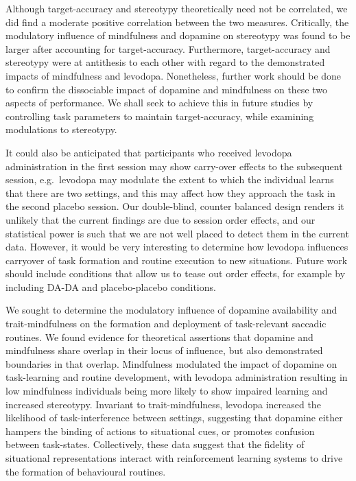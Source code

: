 \documentclass[
  man]{apa6}
\begin{document}
Although target-accuracy and stereotypy theoretically need not be correlated, we did find a moderate positive correlation between the two measures. Critically, the modulatory influence of mindfulness and dopamine on stereotypy was found to be larger after accounting for target-accuracy. Furthermore, target-accuracy and stereotypy were at antithesis to each other with regard to the demonstrated impacts of mindfulness and levodopa. Nonetheless, further work should be done to confirm the dissociable impact of dopamine and mindfulness on these two aspects of performance. We shall seek to achieve this in future studies by controlling task parameters to maintain target-accuracy, while examining modulations to stereotypy.

It could also be anticipated that participants who received levodopa administration in the first session may show carry-over effects to the subsequent session, e.g.~levodopa may modulate the extent to which the individual learns that there are two settings, and this may affect how they approach the task in the second placebo session. Our double-blind, counter balanced design renders it unlikely that the current findings are due to session order effects, and our statistical power is such that we are not well placed to detect them in the current data. However, it would be very interesting to determine how levodopa influences carryover of task formation and routine execution to new situations. Future work should include conditions that allow us to tease out order effects, for example by including DA-DA and placebo-placebo conditions.

We sought to determine the modulatory influence of dopamine availability and trait-mindfulness on the formation and deployment of task-relevant saccadic routines. We found evidence for theoretical assertions that dopamine and mindfulness share overlap in their locus of influence, but also demonstrated boundaries in that overlap. Mindfulness modulated the impact of dopamine on task-learning and routine development, with levodopa administration resulting in low mindfulness individuals being more likely to show impaired learning and increased stereotypy. Invariant to trait-mindfulness, levodopa increased the likelihood of task-interference between settings, suggesting that dopamine either hampers the binding of actions to situational cues, or promotes confusion between task-states. Collectively, these data suggest that the fidelity of situational representations interact with reinforcement learning systems to drive the formation of behavioural routines.
\end{document}
